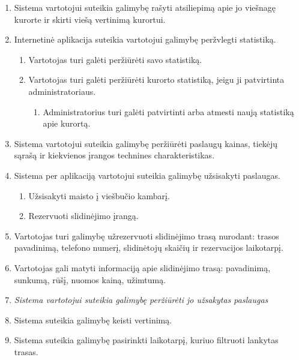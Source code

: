 \documentclass[oneside]{VUMIFPSkursinis}
\begin{document}
\begin{enumerate}
	\item Sistema vartotojui suteikia galimybę rašyti atsiliepimą apie jo viešnagę kurorte ir skirti viešą vertinimą kurortui.
	\item Internetinė aplikacija suteikia vartotojui galimybę peržvlegti statistiką.
	\begin{enumerate}
		\item Vartotojas turi galėti peržiūrėti savo statistiką.
		\item Vartotojas turi galėti peržiūrėti kurorto statistiką, jeigu ji patvirtinta administratoriaus.
		\begin{enumerate}
			\item Administratorius turi galėti patvirtinti arba atmesti naują statistiką apie kurortą.
		\end{enumerate}
	\end{enumerate}
	\item Sistema vartotojui suteikia galimybę peržiūrėti paslaugų kainas, tiekėjų sąrašą ir kiekvienos įrangos technines charakteristikas.
	\item Sistema per aplikaciją vartotojui suteikia galimybę užsisakyti paslaugas.
	\begin{enumerate}
		\item Užsisakyti maisto į viešbučio kambarį.
		\item Rezervuoti slidinėjimo įrangą.
	\end{enumerate}
	\item Vartotojas turi galimybę užrezervuoti slidinėjimo trasą nurodant: trasos pavadinimą, telefono numerį, slidinėtojų skaičių ir rezervacijos laikotarpį.
	\item Vartotojas gali matyti informaciją apie slidinėjimo trasą: pavadinimą, sunkumą, rūšį, nuomos kainą, užimtumą.
	\item \textit{Sistema vartotojui suteikia galimybę peržiūrėti jo užsakytas paslaugas}
	\item Sistema suteikia galimybę keisti vertinimą.
	\item Sistema suteikia galimybę pasirinkti laikotarpį, kuriuo filtruoti lankytas trasas.
	
\end{enumerate}
\end{document}
